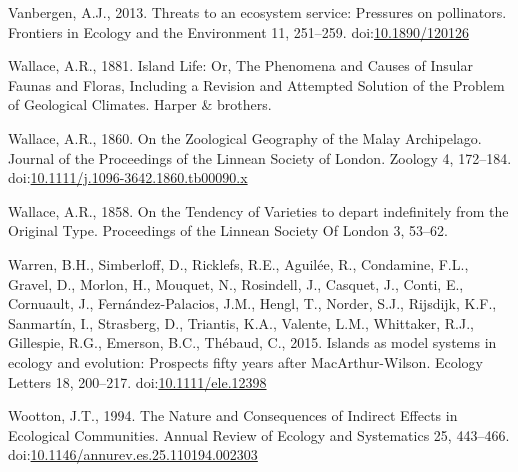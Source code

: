 \hypertarget{ref-Vanbergen2013}{}
Vanbergen, A.J., 2013. Threats to an ecosystem service: Pressures on
pollinators. Frontiers in Ecology and the Environment 11, 251--259.
doi:\href{https://doi.org/10.1890/120126}{10.1890/120126}

\hypertarget{ref-wallace1881island}{}
Wallace, A.R., 1881. Island Life: Or, The Phenomena and Causes of
Insular Faunas and Floras, Including a Revision and Attempted Solution
of the Problem of Geological Climates. Harper \& brothers.

\hypertarget{ref-Wallace1860}{}
Wallace, A.R., 1860. On the Zoological Geography of the Malay
Archipelago. Journal of the Proceedings of the Linnean Society of
London. Zoology 4, 172--184.
doi:\href{https://doi.org/10.1111/j.1096-3642.1860.tb00090.x}{10.1111/j.1096-3642.1860.tb00090.x}

\hypertarget{ref-Wallace1858}{}
Wallace, A.R., 1858. On the Tendency of Varieties to depart indefinitely
from the Original Type. Proceedings of the Linnean Society Of London 3,
53--62.

\hypertarget{ref-Warren2015}{}
Warren, B.H., Simberloff, D., Ricklefs, R.E., Aguilée, R., Condamine,
F.L., Gravel, D., Morlon, H., Mouquet, N., Rosindell, J., Casquet, J.,
Conti, E., Cornuault, J., Fernández-Palacios, J.M., Hengl, T., Norder,
S.J., Rijsdijk, K.F., Sanmartín, I., Strasberg, D., Triantis, K.A.,
Valente, L.M., Whittaker, R.J., Gillespie, R.G., Emerson, B.C., Thébaud,
C., 2015. Islands as model systems in ecology and evolution: Prospects
fifty years after MacArthur-Wilson. Ecology Letters 18, 200--217.
doi:\href{https://doi.org/10.1111/ele.12398}{10.1111/ele.12398}

\hypertarget{ref-Wootton1994a}{}
Wootton, J.T., 1994. The Nature and Consequences of Indirect Effects in
Ecological Communities. Annual Review of Ecology and Systematics 25,
443--466.
doi:\href{https://doi.org/10.1146/annurev.es.25.110194.002303}{10.1146/annurev.es.25.110194.002303}

